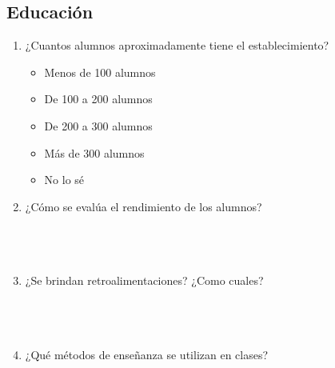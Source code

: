 \documentclass{article}
\begin{document}
\subsection*{Educación}
\begin{enumerate}
    \item ¿Cuantos alumnos aproximadamente tiene el establecimiento? 
        \begin{itemize}[label=$\square$]
            \item Menos de 100 alumnos
            \item De 100 a 200 alumnos
            \item De 200 a 300 alumnos
            \item Más de 300 alumnos
            \item No lo sé
        \end{itemize}
    \item ¿Cómo se evalúa el rendimiento de los alumnos?  \\[0.5cm]
        \underline{\hspace{0.95\linewidth}} \vspace{0.3cm} \\
        \underline{\hspace{0.95\linewidth}} \vspace{0.3cm} \\
        \underline{\hspace{0.95\linewidth}} \vspace{0.3cm} \\
    \item ¿Se brindan retroalimentaciones? ¿Como cuales? \\[0.5cm]
        \underline{\hspace{0.95\linewidth}} \vspace{0.3cm} \\
        \underline{\hspace{0.95\linewidth}} \vspace{0.3cm} \\
        \underline{\hspace{0.95\linewidth}} \vspace{0.3cm} \\
    \item ¿Qué métodos de enseñanza se utilizan en clases? \\[0.5cm]
        \underline{\hspace{0.95\linewidth}} \vspace{0.3cm} \\
        \underline{\hspace{0.95\linewidth}} \vspace{0.3cm} \\

\end{enumerate}
\end{document}
